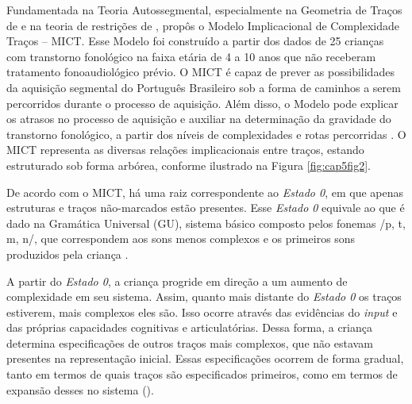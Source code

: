 \documentclass[output=paper,colorlinks,citecolor=brown,booklanguage=portuguese]{langscibook}
\begin{document}
Fundamentada na Teoria Autossegmental, especialmente na Geometria de Traços de \citet{Clements1995} e na teoria de restrições de \citet{Calabrese1995}, \citet{Mota1996} propôs o Modelo Implicacional de Complexidade Traços -- MICT. Esse Modelo foi construído a partir dos dados de 25 crianças com transtorno fonológico na faixa etária de 4 a 10 anos que não receberam tratamento fonoaudiológico prévio. O MICT é capaz de prever as possibilidades da aquisição segmental do Português Brasileiro sob a forma de caminhos a serem percorridos durante o processo de aquisição. Além disso, o Modelo pode explicar os atrasos no processo de aquisição e auxiliar na determinação da gravidade do transtorno fonológico, a partir dos níveis de complexidades e rotas percorridas \citep{Mota1996, Mota2001}. O MICT representa as diversas relações implicacionais entre traços, estando estruturado sob forma arbórea, conforme ilustrado na Figura \ref{fig:cap5fig2}.

De acordo com o MICT, há uma raiz correspondente ao \emph{Estado 0}, em que apenas estruturas e traços não-marcados estão presentes. Esse \emph{Estado 0} equivale ao que é dado na Gramática Universal (GU), sistema básico composto pelos fonemas /p, t, m, n/, que correspondem aos sons menos complexos e os primeiros sons produzidos pela criança \citep{Mota1996}.

A partir do \emph{Estado 0}, a criança progride em direção a um aumento de complexidade em seu sistema. Assim, quanto mais distante do \emph{Estado 0} os traços estiverem, mais complexos eles são. Isso ocorre através das evidências do \emph{input} e das próprias capacidades cognitivas e articulatórias. Dessa forma, a criança determina especificações de outros traços mais complexos, que não estavam presentes na representação inicial. Essas especificações ocorrem de forma gradual, tanto em termos de quais traços são especificados primeiros, como em termos de expansão desses no sistema (\citeauthor[op. cit.]{Mota1996}).
\end{document}
